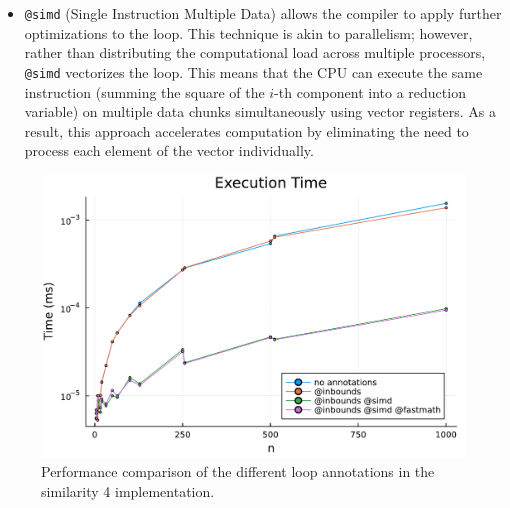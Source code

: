 \documentclass[12pt,	%
	a4paper,		%
	twoside,		%
	openright,		%
	titlepage,%
	]{book}
\theoremstyle{definition}
\newcommand{\mjline}[1]{\texttt{#1}}
\begin{document}
\begin{itemize}
    \item \mjline{@simd} (Single Instruction Multiple Data) allows the compiler to apply further optimizations to the loop. This technique is akin to parallelism; however, rather than distributing the computational load across multiple processors, \mjline{@simd} vectorizes the loop. This means that the CPU can execute the same instruction (summing the square of the $i$-th component into a reduction variable) on multiple data chunks simultaneously using vector registers. As a result, this approach accelerates computation by eliminating the need to process each element of the vector individually.
\end{itemize}

\begin{figure}[!ht]
    \centering
    \includegraphics[width=1\linewidth]{Plots/execution_time_tests_sims_pow2.pdf}
    \caption[Performance comparison of similarity 4 annotations]{Performance comparison of the different loop annotations in the similarity 4 implementation.}
    \label{fig: exec time sim}
\end{figure}
\end{document}
